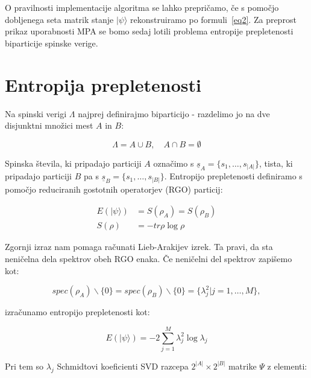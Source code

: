\documentclass[a4paper]{article}
\newcommand{\ket}[1]{|#1\rangle}
\newcommand{\range}[2]{#1, \ldots, #2}
\newcommand{\us}{\underline{s}}
\begin{document}
    O pravilnosti implementacije algoritma  se lahko prepričamo, če s pomočjo dobljenega seta matrik stanje $\ket{\psi}$ rekonstruiramo po
    formuli~\ref{eq2}.
    Za preprost prikaz uporabnosti MPA se bomo sedaj lotili problema entropije prepletenosti biparticije spinske verige.

    \section{Entropija prepletenosti}
    
    Na spinski verigi $\Lambda$ najprej definirajmo biparticijo - razdelimo jo na dve disjunktni množici mest $A$ in $B$:
 
    \begin{equation}\label{eq14}
        \Lambda = A \cup B, \quad A \cap B = \emptyset
    \end{equation}

    Spinska števila, ki pripadajo particiji $A$ označimo s $\us_A = \{\range{s_1}{s_{|A|}}\}$, tista, ki pripadajo particiji $B$ pa s
    $\us_B = \{\range{s_1}{s_{|B|}}\}$.
    Entropijo prepletenosti definiramo s pomočjo reduciranih gostotnih operatorjev (RGO) particij:
 
    \begin{equation}\label{eq15}
        \begin{split}
            E(\ket{\psi}) &= S(\rho_A) = S(\rho_B) \\
            S(\rho) &= -tr\rho\log\rho
        \end{split}
    \end{equation}

    Zgornji izraz nam pomaga računati Lieb-Arakijev izrek. Ta pravi, da sta neničelna dela spektrov obeh RGO enaka. Če neničelni
    del spektrov zapišemo kot:
 
    \begin{equation}\label{eq16}
        spec(\rho_A)\backslash\{0\} = spec(\rho_B)\backslash\{0\} = \big\{ \lambda_j^2 | j = \range{1}{M} \big\},
    \end{equation}

    izračunamo entropijo prepletenosti kot:
 
    \begin{equation}\label{eq17}
        E(\ket{\psi}) = -2\sum_{j=1}^M \lambda_j^2 \log{\lambda_j}
    \end{equation}

    Pri tem so $\lambda_j$ Schmidtovi koeficienti SVD razcepa $2^{|A|} \times 2^{|B|}$ matrike $\Psi$ z elementi:
 
\end{document}
